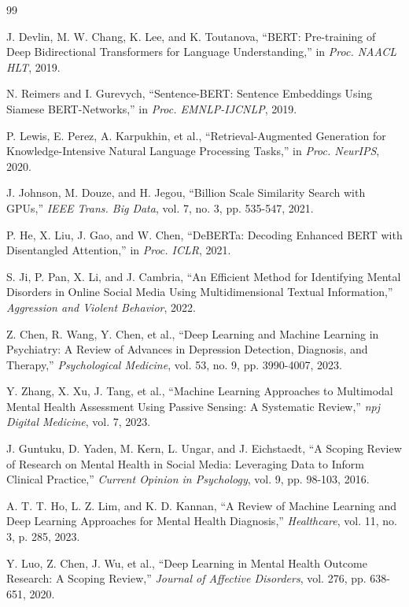 \documentclass[11pt]{article}
\begin{document}
\begin{thebibliography}{99}

J. Devlin, M. W. Chang, K. Lee, and K. Toutanova, ``BERT: Pre-training of Deep Bidirectional Transformers for Language Understanding,'' in \textit{Proc. NAACL HLT}, 2019.

N. Reimers and I. Gurevych, ``Sentence-BERT: Sentence Embeddings Using Siamese BERT-Networks,'' in \textit{Proc. EMNLP-IJCNLP}, 2019.

P. Lewis, E. Perez, A. Karpukhin, et al., ``Retrieval-Augmented Generation for Knowledge-Intensive Natural Language Processing Tasks,'' in \textit{Proc. NeurIPS}, 2020.

J. Johnson, M. Douze, and H. Jegou, ``Billion Scale Similarity Search with GPUs,'' \textit{IEEE Trans. Big Data}, vol. 7, no. 3, pp. 535-547, 2021.

P. He, X. Liu, J. Gao, and W. Chen, ``DeBERTa: Decoding Enhanced BERT with Disentangled Attention,'' in \textit{Proc. ICLR}, 2021.

S. Ji, P. Pan, X. Li, and J. Cambria, ``An Efficient Method for Identifying Mental Disorders in Online Social Media Using Multidimensional Textual Information,'' \textit{Aggression and Violent Behavior}, 2022.

Z. Chen, R. Wang, Y. Chen, et al., ``Deep Learning and Machine Learning in Psychiatry: A Review of Advances in Depression Detection, Diagnosis, and Therapy,'' \textit{Psychological Medicine}, vol. 53, no. 9, pp. 3990-4007, 2023.

Y. Zhang, X. Xu, J. Tang, et al., ``Machine Learning Approaches to Multimodal Mental Health Assessment Using Passive Sensing: A Systematic Review,'' \textit{npj Digital Medicine}, vol. 7, 2023.

J. Guntuku, D. Yaden, M. Kern, L. Ungar, and J. Eichstaedt, ``A Scoping Review of Research on Mental Health in Social Media: Leveraging Data to Inform Clinical Practice,'' \textit{Current Opinion in Psychology}, vol. 9, pp. 98-103, 2016.

A. T. T. Ho, L. Z. Lim, and K. D. Kannan, ``A Review of Machine Learning and Deep Learning Approaches for Mental Health Diagnosis,'' \textit{Healthcare}, vol. 11, no. 3, p. 285, 2023.

Y. Luo, Z. Chen, J. Wu, et al., ``Deep Learning in Mental Health Outcome Research: A Scoping Review,'' \textit{Journal of Affective Disorders}, vol. 276, pp. 638-651, 2020.


\end{thebibliography}
\end{document}
